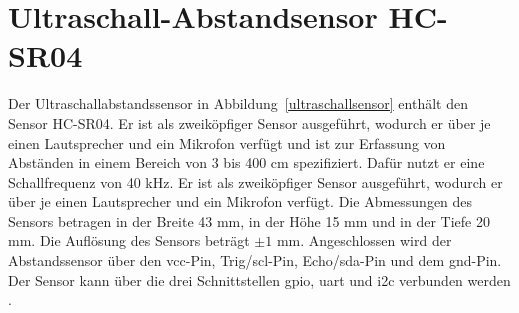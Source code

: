 

\section{Ultraschall-Abstandsensor HC-SR04}

Der Ultraschallabstandssensor in Abbildung~\ref{ultraschallsensor} enthält den Sensor HC-SR04. Er ist als zweiköpfiger Sensor ausgeführt, wodurch er über je einen Lautsprecher und ein Mikrofon verfügt und ist  zur Erfassung von Abständen in einem Bereich von 3 bis 400 cm spezifiziert. Dafür nutzt er eine Schallfrequenz von 40 kHz. Er ist als zweiköpfiger Sensor ausgeführt, wodurch er über je einen Lautsprecher und ein Mikrofon verfügt.  Die Abmessungen des Sensors betragen in der Breite 43 mm, in der Höhe 15 mm und in der Tiefe 20 mm. Die Auflösung des Sensors beträgt $\pm 1$ mm. Angeschlossen wird der Abstandssensor über den \ac{vcc}-Pin, Trig/\ac{scl}-Pin, Echo/\ac{sda}-Pin und dem \ac{gnd}-Pin. Der Sensor kann über die drei Schnittstellen \ac{gpio}, \ac{uart} und \ac{i2c} verbunden werden \cite{Simac:2017}. 


